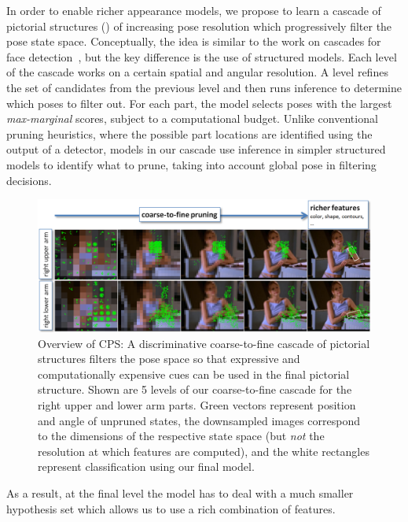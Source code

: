In order to enable richer appearance models, we propose to learn a cascade of 
pictorial structures (\CPS) of increasing pose resolution which 
progressively filter the pose state space.  Conceptually, the idea is similar 
to the work on cascades for face detection~\cite{geman2001,viola02}, but the 
key difference is the use of structured models. Each level of the cascade works on a certain spatial and angular resolution.  A level refines the set of candidates from the 
previous level and then runs inference to determine which poses to filter out.  
For each part, the model selects poses with the largest {\em max-marginal}
scores, subject to a computational budget.  Unlike conventional pruning 
heuristics, where the possible part locations are identified using the output 
of a detector, models in our cascade use inference in simpler structured models 
to identify what to prune, taking into account global pose in filtering 
decisions.
\begin{figure}[t]
\begin{center}
\includegraphics[width=1.0\textwidth]{figs/cps-overview.png}
\end{center}
\caption[Overview of Cascaded Pictorial Structures 
(CPS)]{\label{fig:cps-overview} Overview of CPS:  A discriminative 
coarse-to-fine cascade of pictorial structures filters the pose space so that 
expressive and computationally expensive cues can be used in the final 
pictorial structure.  Shown are 5 levels of our coarse-to-fine cascade for the 
right upper and lower arm parts.  Green vectors represent position and angle of 
unpruned states, the downsampled images correspond to the dimensions of the 
respective state space (but {\em not } the resolution at which features are 
computed), and the white rectangles represent classification using our final 
model.}
\end{figure}
As a result, at the final level the \CPS{} model has to deal with a much 
smaller hypothesis set which allows us to use a rich combination of features.  

